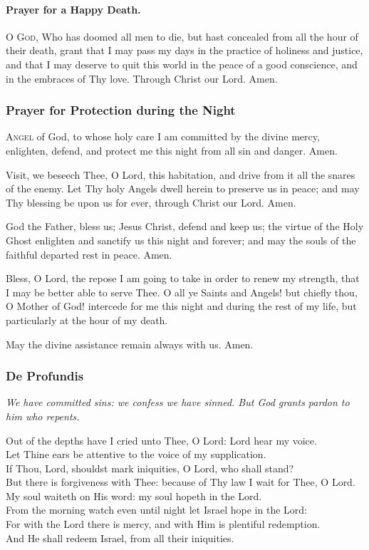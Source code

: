 \documentclass{article}
\begin{document}
\begin{multicols}{3}
\paragraph{Prayer for a Happy Death.}
\textsc{O God,} Who has doomed all men to die, but hast concealed from all the hour of their death,
grant that I may pass my days in the practice of holiness and justice, and that I may deserve to
quit this world in the peace of a good conscience, and in the embraces of Thy love.  Through Christ
our Lord. Amen.

\subsubsection*{Prayer for Protection during the Night}

\textsc{Angel} of God, to whose holy care I am committed by the divine mercy, enlighten, defend,
and protect me this night from all sin and danger.  Amen.

Visit, we beseech Thee, O Lord, this habitation, and drive from it all the snares of the enemy.
Let Thy holy Angels dwell herein to preserve us in peace; and may Thy blessing be upon us for
ever, through Christ our Lord. Amen.

God the Father, bless us; Jesus Christ, defend and keep us; the virtue of the Holy Ghost enlighten
and sanctify us this night and forever; and may the souls of the faithful departed rest in peace.
Amen.

Bless, O Lord, the repose I am going to take in order to renew my strength, that I may be better
able to serve Thee.  O all ye Saints and Angels! but chiefly thou, O Mother of God! intercede
for me this night and during the rest of my life, but particularly at the hour of my death.

May the divine assistance remain always with us.  Amen.

\subsubsection*{De Profundis}

\textit{We have committed sins: we confess we have sinned. But God grants pardon to him who repents.}

Out of the depths have I cried unto Thee, O Lord: Lord hear my voice.\\
Let Thine ears be attentive to the voice of my supplication.\\
If Thou, Lord, shouldst mark iniquities, O Lord, who shall stand?\\
But there is forgiveness with Thee: because of Thy law I wait for Thee, O Lord.\\
My soul waiteth on His word: my soul hopeth in the Lord.\\
From the morning watch even until night let Israel hope in the Lord:\\
For with the Lord there is mercy, and with Him is plentiful redemption.\\
And He shall redeem Israel, from all their iniquities.


\end{multicols}
\end{document}
